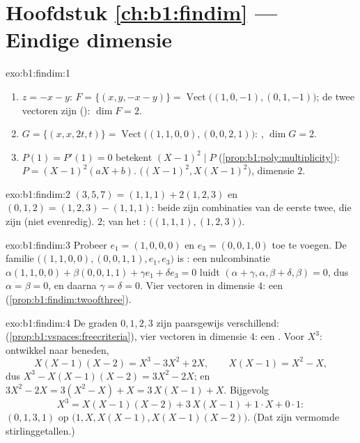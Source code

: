 \section*{Hoofdstuk \ref{ch:b1:findim} --- Eindige dimensie}

\begin{solution}{exo:b1:findim:1}
\begin{enumerate}
  \item $z = -x - y$: $F = \{(x, y, -x-y)\} =
        \operatorname{Vect}\bigl((1,0,-1), (0,1,-1)\bigr)$; de twee
        vectoren zijn  (): $\dim F = 2$.
  \item $G = \{(x, x, 2t, t)\} =
        \operatorname{Vect}\bigl((1,1,0,0), (0,0,2,1)\bigr)$: ,
        $\dim G = 2$.
  \item $P(1) = P'(1) = 0$ betekent $(X-1)^2 \mid P$
        (\cref{prop:b1:poly:multiplicity}): $P = (X-1)^2(aX + b)$.
         $\bigl((X-1)^2, X(X-1)^2\bigr)$, dimensie $2$.
\end{enumerate}
\end{solution}

\begin{solution}{exo:b1:findim:2}
$(3,5,7) = (1,1,1) + 2(1,2,3)$ en $(0,1,2) = (1,2,3) - (1,1,1)$:
beide zijn combinaties van de eerste twee, die  zijn (niet
evenredig).  $2$;  van het :
$\bigl((1,1,1), (1,2,3)\bigr)$.
\end{solution}

\begin{solution}{exo:b1:findim:3}
Probeer $e_1 = (1,0,0,0)$ en $e_3 = (0,0,1,0)$ toe te voegen. De
familie $\bigl((1,1,0,0), (0,0,1,1), e_1, e_3\bigr)$ is : een
nulcombinatie $\alpha(1,1,0,0) + \beta(0,0,1,1) + \gamma e_1 +
\delta e_3 = 0$ luidt $(\alpha + \gamma, \alpha, \beta + \delta,
\beta) = 0$, dus $\alpha = \beta = 0$, en daarna $\gamma = \delta =
0$. Vier  vectoren in dimensie $4$: een 
(\cref{prop:b1:findim:twoofthree}).
\end{solution}

\begin{solution}{exo:b1:findim:4}
De graden $0, 1, 2, 3$ zijn paarsgewijs verschillend: 
(\cref{prop:b1:vspaces:freecriteria}), vier vectoren in dimensie
$4$: een . Voor $X^3$: ontwikkel naar beneden,
\[
X(X-1)(X-2) = X^3 - 3X^2 + 2X,
\qquad
X(X-1) = X^2 - X,
\]
dus $X^3 - X(X-1)(X-2) = 3X^2 - 2X$; en $3X^2 - 2X = 3(X^2 - X) + X
= 3\,X(X-1) + X$. Bijgevolg
\[
X^3 = X(X-1)(X-2) + 3\,X(X-1) + 1\cdot X + 0\cdot 1 :
\]
 $(0, 1, 3, 1)$ op $\bigl(1, X, X(X-1),
X(X-1)(X-2)\bigr)$. (Dat zijn vermomde stirlinggetallen.)
\end{solution}


